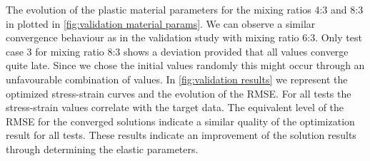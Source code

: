 The evolution of the plastic material parameters for the mixing ratios 4:3 and 8:3 in plotted in \autoref{fig:validation material params}. We can observe a similar convergence behaviour as in the validation study with mixing ratio 6:3. Only test case 3 for mixing ratio 8:3 shows a deviation provided that all values converge quite late. Since we chose the initial values randomly this might occur through an unfavourable combination of values. 
In \autoref{fig:validation results} we represent the optimized stress-strain curves and the evolution of the RMSE. For all tests the stress-strain values correlate with the target data. The equivalent level of the RMSE for the converged solutions indicate a similar quality of the optimization result for all tests. These results indicate an improvement of the solution results through determining the elastic parameters.
    


